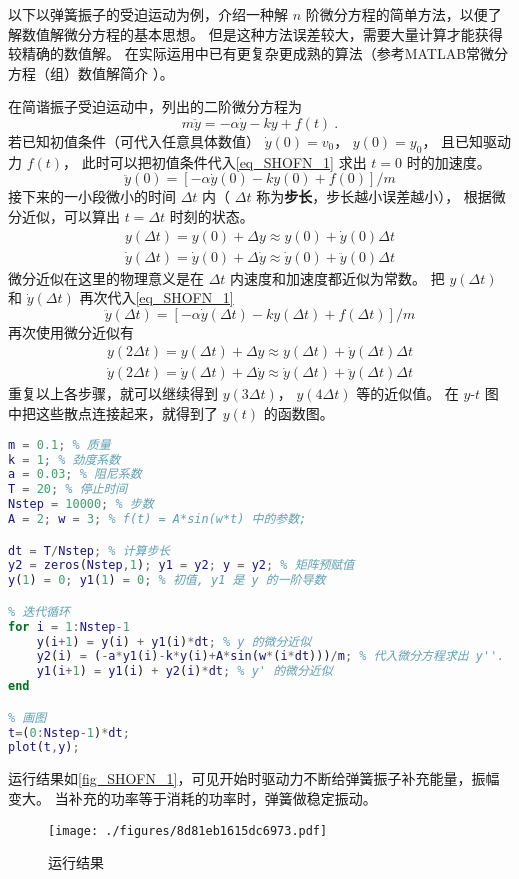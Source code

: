 

以下以弹簧振子的受迫运动为例，介绍一种解 $n$ 阶微分方程的简单方法，以便了解数值解微分方程的基本思想。 但是这种方法误差较大，需要大量计算才能获得较精确的数值解。 在实际运用中已有更复杂更成熟的算法（参考MATLAB常微分方程（组）数值解简介%
）。

在简谐振子受迫运动中，列出的二阶微分方程为
\begin{equation}\label{eq_SHOFN_1}
m\ddot y = -\alpha \dot y - ky + f(t)~.
\end{equation}
若已知初值条件（可代入任意具体数值） $\dot y(0) = v_0$，  $y(0) = y_0$， 且已知驱动力 $f(t)$， 此时可以把初值条件代入\autoref{eq_SHOFN_1} 求出 $t = 0$ 时的加速度。
\begin{equation}
\ddot y(0) = [- \alpha \dot y(0) - ky(0) + f(0)]/m
\end{equation}
接下来的一小段微小的时间 $\Delta t$ 内（ $\Delta t$ 称为\textbf{步长}，步长越小误差越小）， 根据微分近似，可以算出 $t = \Delta t$ 时刻的状态。
\begin{gather}
y(\Delta t) =  y(0) + \Delta y \approx y(0) + \dot y(0) \Delta t\\
\dot y(\Delta t) = \dot y(0) + \Delta \dot y \approx \dot y(0) + \ddot y(0) \Delta t
\end{gather}
微分近似在这里的物理意义是在 $\Delta t$ 内速度和加速度都近似为常数。 把 $y(\Delta t)$ 和 $\dot y(\Delta t)$ 再次代入\autoref{eq_SHOFN_1}
\begin{equation}
\ddot y(\Delta t) = [- \alpha \dot y(\Delta t) - ky(\Delta t) + f(\Delta t)]/m
\end{equation}
再次使用微分近似有
\begin{gather}
y(2\Delta t) =  y(\Delta t) + \Delta y \approx y(\Delta t) + \dot y(\Delta t) \Delta t\\
\dot y(2\Delta t) = \dot y(\Delta t) + \Delta \dot y \approx \dot y(\Delta t) + \ddot y(\Delta t) \Delta t
\end{gather}
重复以上各步骤，就可以继续得到 $y(3\Delta t)$，  $y(4\Delta t)$ 等的近似值。 在 $y$-$t$ 图中把这些散点连接起来，就得到了 $y(t)$ 的函数图。

\begin{lstlisting}[language=matlab, caption=SHOf.m]
% 参数设定
m = 0.1; % 质量
k = 1; % 劲度系数
a = 0.03; % 阻尼系数
T = 20; % 停止时间
Nstep = 10000; % 步数
A = 2; w = 3; % f(t) = A*sin(w*t) 中的参数;

dt = T/Nstep; % 计算步长
y2 = zeros(Nstep,1); y1 = y2; y = y2; % 矩阵预赋值
y(1) = 0; y1(1) = 0; % 初值, y1 是 y 的一阶导数

% 迭代循环
for i = 1:Nstep-1
    y(i+1) = y(i) + y1(i)*dt; % y 的微分近似
    y2(i) = (-a*y1(i)-k*y(i)+A*sin(w*(i*dt)))/m; % 代入微分方程求出 y''.
    y1(i+1) = y1(i) + y2(i)*dt; % y' 的微分近似
end

% 画图
t=(0:Nstep-1)*dt;
plot(t,y);
\end{lstlisting}

运行结果如\autoref{fig_SHOFN_1}，可见开始时驱动力不断给弹簧振子补充能量，振幅变大。 当补充的功率等于消耗的功率时，弹簧做稳定振动。
\begin{figure}[ht]
\centering
\texttt{[image: ./figures/8d81eb1615dc6973.pdf]}
\caption{运行结果}\label{fig_SHOFN_1}
\end{figure}
